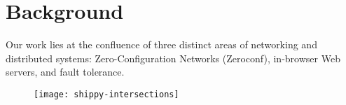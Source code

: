 \section{Background}
\label{sec:background}

Our work lies at the confluence of three distinct areas of networking and distributed systems: Zero-Configuration Networks (Zeroconf), in-browser Web servers, and fault tolerance.

\begin{figure}[h]
      \centering
      \texttt{[image: shippy-intersections]}
      \label{fig:stack}
\end{figure}






